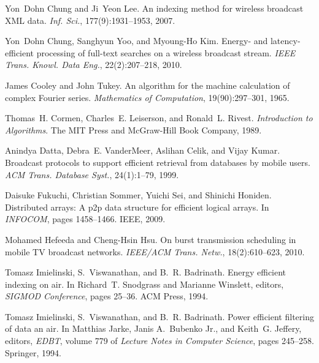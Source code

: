 \documentclass{article}
\newcommand{\tmtextit}[1]{{\itshape{#1}}}
\begin{document}
\begin{thebibliography}{10}
  Yon~Dohn Chung and Ji~Yeon Lee.
  {\newblock}An indexing method for wireless broadcast XML data.
  {\newblock}\tmtextit{Inf. Sci.}, 177(9):1931--1953, 2007.
  
  Yon~Dohn Chung, Sanghyun Yoo, and
  Myoung-Ho Kim. {\newblock}Energy- and latency-efficient processing of
  full-text searches on a wireless broadcast stream. {\newblock}\tmtextit{IEEE
  Trans. Knowl. Data Eng.}, 22(2):207--218, 2010.
  
  James Cooley and John Tukey. {\newblock}An algorithm
  for the machine calculation of complex Fourier series.
  {\newblock}\tmtextit{Mathematics of Computation}, 19(90):297--301, 1965.
  
  Thomas~H. Cormen, Charles~E. Leiserson, and Ronald~L.
  Rivest. {\newblock}\tmtextit{Introduction to Algorithms}. {\newblock}The MIT
  Press and McGraw-Hill Book Company, 1989.
  
  Anindya Datta, Debra~E.
  VanderMeer, Aslihan Celik, and Vijay Kumar. {\newblock}Broadcast protocols
  to support efficient retrieval from databases by mobile users.
  {\newblock}\tmtextit{ACM Trans. Database Syst.}, 24(1):1--79, 1999.
  
  Daisuke Fukuchi, Christian
  Sommer, Yuichi Sei, and Shinichi Honiden. {\newblock}Distributed arrays: A
  p2p data structure for efficient logical arrays. {\newblock}In
  \tmtextit{INFOCOM}, pages 1458--1466. IEEE, 2009.
  
  Mohamed Hefeeda and Cheng-Hsin Hsu.
  {\newblock}On burst transmission scheduling in mobile TV broadcast networks.
  {\newblock}\tmtextit{IEEE/ACM Trans. Netw.}, 18(2):610--623, 2010.
  
  Tomasz Imielinski,
  S.~Viswanathan, and B.~R. Badrinath. {\newblock}Energy efficient indexing on
  air. {\newblock}In Richard~T. Snodgrass and Marianne Winslett, editors,
  \tmtextit{SIGMOD Conference}, pages 25--36. ACM Press, 1994.
  
  Tomasz Imielinski, S.~Viswanathan,
  and B.~R. Badrinath. {\newblock}Power efficient filtering of data an air.
  {\newblock}In Matthias Jarke, Janis A.~Bubenko Jr., and Keith~G. Jeffery,
  editors, \tmtextit{EDBT}, volume 779 of \tmtextit{Lecture Notes in Computer
  Science}, pages 245--258. Springer, 1994.
  

\end{thebibliography}
\end{document}
